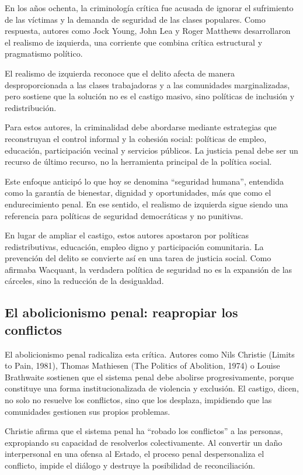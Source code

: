 \documentclass[
  spanish,
  letterpaper,
  DIV=11,
  numbers=noendperiod]{scrreprt}
\begin{document}
En los años ochenta, la criminología crítica fue acusada de ignorar el
sufrimiento de las víctimas y la demanda de seguridad de las clases
populares. Como respuesta, autores como Jock Young, John Lea y Roger
Matthews desarrollaron el realismo de izquierda, una corriente que
combina crítica estructural y pragmatismo político.

El realismo de izquierda reconoce que el delito afecta de manera
desproporcionada a las clases trabajadoras y a las comunidades
marginalizadas, pero sostiene que la solución no es el castigo masivo,
sino políticas de inclusión y redistribución.

Para estos autores, la criminalidad debe abordarse mediante estrategias
que reconstruyan el control informal y la cohesión social: políticas de
empleo, educación, participación vecinal y servicios públicos. La
justicia penal debe ser un recurso de último recurso, no la herramienta
principal de la política social.

Este enfoque anticipó lo que hoy se denomina ``seguridad humana'',
entendida como la garantía de bienestar, dignidad y oportunidades, más
que como el endurecimiento penal. En ese sentido, el realismo de
izquierda sigue siendo una referencia para políticas de seguridad
democráticas y no punitivas.

En lugar de ampliar el castigo, estos autores apostaron por políticas
redistributivas, educación, empleo digno y participación comunitaria. La
prevención del delito se convierte así en una tarea de justicia social.
Como afirmaba Wacquant, la verdadera política de seguridad no es la
expansión de las cárceles, sino la reducción de la desigualdad.

\subsection{El abolicionismo penal: reapropiar los
conflictos}\label{el-abolicionismo-penal-reapropiar-los-conflictos}

El abolicionismo penal radicaliza esta crítica. Autores como Nils
Christie (Limits to Pain, 1981), Thomas Mathiesen (The Politics of
Abolition, 1974) o Louise Brathwaite sostienen que el sistema penal debe
abolirse progresivamente, porque constituye una forma institucionalizada
de violencia y exclusión. El castigo, dicen, no solo no resuelve los
conflictos, sino que los desplaza, impidiendo que las comunidades
gestionen sus propios problemas.

Christie afirma que el sistema penal ha ``robado los conflictos'' a las
personas, expropiando su capacidad de resolverlos colectivamente. Al
convertir un daño interpersonal en una ofensa al Estado, el proceso
penal despersonaliza el conflicto, impide el diálogo y destruye la
posibilidad de reconciliación.
\end{document}
